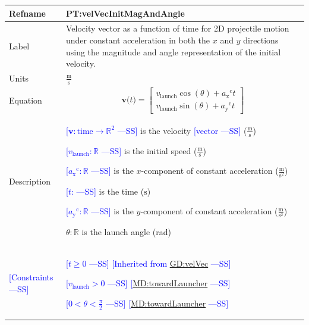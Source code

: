 \documentclass[12pt]{article}
\newcommand{\authornote}[3]{\textcolor{#1}{[#3 ---#2]}}
\newcommand{\authornote}[3]{}
\newcommand{\wss}[1]{\authornote{blue}{SS}{#1}}
\begin{document}
\noindent
\begin{minipage}{\textwidth}
\begin{tabular}{>{\raggedright}p{}>{\raggedright\arraybackslash}p{}}
\toprule \textbf{Refname} & \textbf{PT:velVecInitMagAndAngle}
\label{PT:velVecInitMagAndAngle}
\\ \midrule
Label & Velocity vector as a function of time for 2D projectile motion under
constant acceleration in both the $x$ and $y$ directions using the magnitude and
angle representation of the initial velocity.
        
\\ \midrule
Units & $\frac{\text{m}}{\text{s}}$
        
\\ \midrule
Equation & \begin{displaymath}
           \symbf{v}\text{(}t\text{)}=\begin{bmatrix}
                                      {{v}_{\text{launch}}} \cos(\theta)+{{a_{\text{x}}}^{\text{c}}} t\\
                                      {{v}_{\text{launch}}} \sin(\theta)+{{a_{\text{y}}}^{\text{c}}} t
                                      \end{bmatrix}
           \end{displaymath}
\\ \midrule
Description & \begin{symbDescription}
              \item{\wss{$\symbf{v}: \text{time} \rightarrow \mathbb{R}^2$} is the velocity \wss{vector} ($\frac{\text{m}}{\text{s}}$)}
              \item{\wss{${{v}_{\text{launch}}}: \mathbb{R}$} is the initial speed ($\frac{\text{m}}{\text{s}}$)}
              \item{\wss{${{a_{\text{x}}}^{\text{c}}}: \mathbb{R}$} is the $x$-component of constant acceleration ($\frac{\text{m}}{\text{s}^{2}}$)}
              \item{\wss{$t$: \text{time}} is the time (${\text{s}}$)}
              \item{\wss{${{a_{\text{y}}}^{\text{c}}}: \mathbb{R}$} is the $y$-component of constant acceleration ($\frac{\text{m}}{\text{s}^{2}}$)}
              \item $\theta: \mathbb{R}$ is the launch angle (rad)
              \end{symbDescription}

\\ \midrule
\wss{Constraints} & 
\begin{symbDescription}
\item \wss{$t \geq 0$} \wss{Inherited from \hyperref[GD:velVec]{GD:velVec}}
\item \wss{$v_\text{launch} > 0$} \wss{\hyperref[MD:towardLauncher]{MD:towardLauncher}}
\item \wss{$0 < \theta < \frac{\pi}{2}$} \wss{\hyperref[MD:towardLauncher]{MD:towardLauncher}}
\end{symbDescription}


\end{tabular}
\end{minipage}
\end{document}
